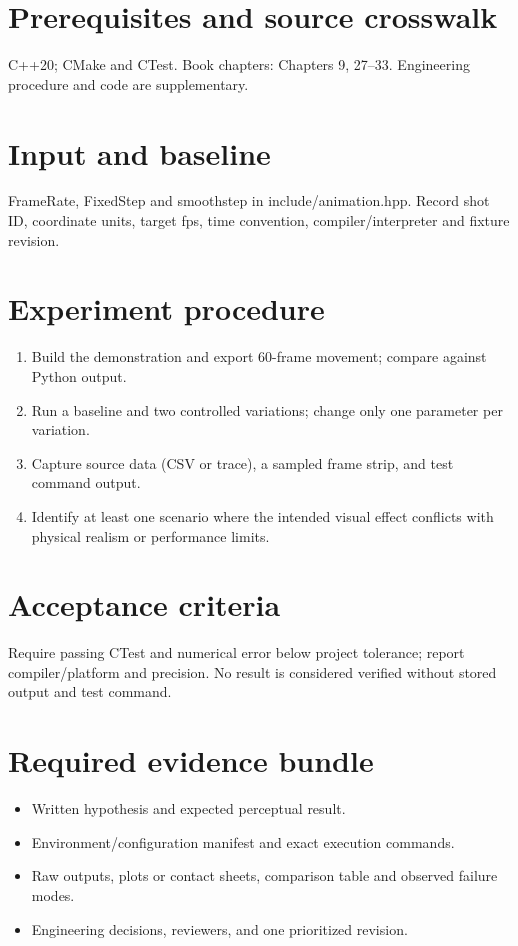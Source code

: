 \documentclass[10pt,letterpaper]{article}
\begin{document}
\makedoctitle
\makedocsummary

\section{Prerequisites and source crosswalk}
C++20; CMake and CTest. Book chapters: Chapters 9, 27--33. Engineering procedure and code are supplementary.
\section{Input and baseline}
FrameRate, FixedStep and smoothstep in include/animation.hpp. Record shot ID, coordinate units, target fps, time convention, compiler/interpreter and fixture revision.
\section{Experiment procedure}
\begin{enumerate}
\item Build the demonstration and export 60-frame movement; compare against Python output.
\item Run a baseline and two controlled variations; change only one parameter per variation.
\item Capture source data (CSV or trace), a sampled frame strip, and test command output.
\item Identify at least one scenario where the intended visual effect conflicts with physical realism or performance limits.
\end{enumerate}
\section{Acceptance criteria}
Require passing CTest and numerical error below project tolerance; report compiler/platform and precision. No result is considered verified without stored output and test command.
\section{Required evidence bundle}
\begin{itemize}
\item Written hypothesis and expected perceptual result.
\item Environment/configuration manifest and exact execution commands.
\item Raw outputs, plots or contact sheets, comparison table and observed failure modes.
\item Engineering decisions, reviewers, and one prioritized revision.
\end{itemize}
\end{document}
